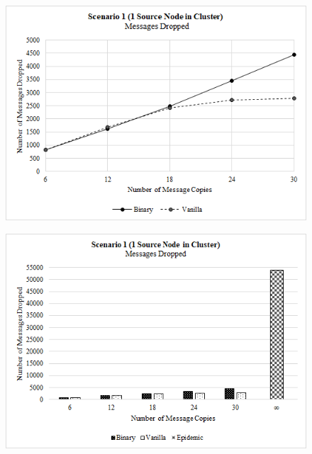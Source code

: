 \documentclass{article}
\begin{document}
\begin{figure}[h!]
\centering
\begin{minipage}[t]{.5\textwidth}
  \centering
  \includegraphics[width=.98\linewidth]{Results/Graphs/MessagesDropped/S1_MessagesDropped_SprayAndWaitComparison.png}
  \label{fig:test1}
\end{minipage}%
\begin{minipage}[t]{.5\textwidth}
  \centering
  \includegraphics[width=.98\linewidth]{Results/Graphs/MessagesDropped/S1_MessagesDropped_AllComparison.png}
  \label{fig:test2}
\end{minipage}

\end{figure}
\end{document}
